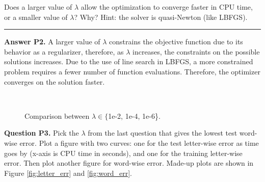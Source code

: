 \documentclass[11pt]{report}
\begin{document}
Does a larger value of $\lambda$ allow the optimization to converge faster in CPU time,
or a smaller value of $\lambda$?  Why?
Hint: the solver is quasi-Newton (like LBFGS).

\rule{\paperwidth}{0.6pt}
{\bf Answer P2.} A larger value of $\lambda$ constrains the objective function due to its behavior as a regularizer, therefore, as $\lambda$ increases, the constraints on the possible solutions increases. Due to the use of line search in LBFGS, a more constrained problem requires a fewer number of function evaluations. Therefore, the optimizer converges on the solution faster.

\begin{figure}[t]
\centering
{}
~~
~~
\caption{Comparison between $\lambda \in \{${\sf 1e-2, 1e-4, 1e-6}\}.}
\label{fig:compare_sgd}
\end{figure}

{\bf Question P3.}
Pick the $\lambda$ from the last question that gives the lowest test word-wise error.
Plot a figure with two curves:
one for the test letter-wise error as time goes by (x-axis is CPU time in seconds),
and one for the training letter-wise error.
Then plot another figure for word-wise error.
Made-up plots are shown in Figure \ref{fig:letter_err} and \ref{fig:word_err}.
\end{document}
